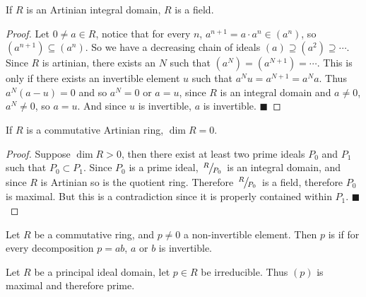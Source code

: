 \documentclass[10pt]{article}
\def\qed{\hskip1cm\hbox{}\hfill$\blacksquare$}
\begin{document}
\begin{prop*}

    If $R$ is an Artinian integral domain, $R$ is a field.

\end{prop*}

\begin{proof}

    Let $0\neq a\in R$, notice that for every $n$, $a^{n+1}=a\cdot a^{n}\in(a^n)$, so $(a^{n+1})\subseteq(a^n)$.
    So we have a decreasing chain of ideals $(a)\supseteq(a^2)\supseteq\cdots$.
    Since $R$ is artinian, there exists an $N$ such that $(a^N)=(a^{N+1})=\cdots$.
    This is only if there exists an invertible element $u$ such that $a^Nu=a^{N+1}=a^Na$.
    Thus $a^N(a-u)=0$ and so $a^N=0$ or $a=u$, since $R$ is an integral domain and $a\neq0$, $a^N\neq0$, so $a=u$.
    And since $u$ is invertible, $a$ is invertible.
    \qed

\end{proof}

\begin{prop*}

    If $R$ is a commutative Artinian ring, $\dim R=0$.

\end{prop*}

\begin{proof}

    Suppose $\dim R>0$, then there exist at least two prime ideals $P_0$ and $P_1$ such that $P_0\subset P_1$.
    Since $P_0$ is a prime ideal, $\slfrac R{P_0}$ is an integral domain, and since $R$ is Artinian so is the quotient ring.
    Therefore $\slfrac R{P_0}$ is a field, therefore $P_0$ is maximal.
    But this is a contradiction since it is properly contained within $P_1$.
    \qed

\end{proof}

\begin{defn*}

    Let $R$ be a commutative ring, and $p\neq0$ a non-invertible element.
    Then $p$ is  if for every decomposition $p=ab$, $a$ or $b$ is invertible.

\end{defn*}

\begin{prop*}

    Let $R$ be a principal ideal domain, let $p\in R$ be irreducible.
    Thus $(p)$ is maximal and therefore prime.

\end{prop*}
\end{document}
